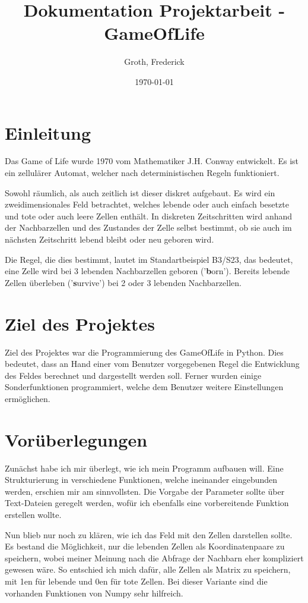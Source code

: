 \documentclass{scrartcl}
\begin{document}
\title{Dokumentation Projektarbeit - GameOfLife}
\author{Groth, Frederick}
\date{\today}
\maketitle
\newpage
\tableofcontents
\newpage
\section{Einleitung}
Das Game of Life wurde 1970 vom Mathematiker J.H. Conway entwickelt. Es ist ein zellulärer Automat, welcher nach deterministischen Regeln funktioniert.

Sowohl räumlich, als auch zeitlich ist dieser diskret aufgebaut. Es wird ein zweidimensionales Feld betrachtet, welches lebende oder auch einfach besetzte und tote oder auch leere Zellen enthält. In diskreten Zeitschritten wird anhand der Nachbarzellen und des Zustandes der Zelle selbst bestimmt, ob sie auch im nächsten Zeitschritt lebend bleibt oder neu geboren wird.

Die Regel, die dies bestimmt, lautet im Standartbeispiel B3/S23, das bedeutet, eine Zelle wird bei 3 lebenden Nachbarzellen geboren ('\textbf{b}orn'). Bereits lebende Zellen überleben ('\textbf{s}urvive') bei 2 oder 3 lebenden Nachbarzellen.
\section{Ziel des Projektes}
Ziel des Projektes war die Programmierung des GameOfLife in Python.
Dies bedeutet, dass an Hand einer vom Benutzer vorgegebenen Regel die Entwicklung des Feldes berechnet und dargestellt werden soll. Ferner wurden einige Sonderfunktionen programmiert, welche dem Benutzer weitere Einstellungen ermöglichen.
\section{Vorüberlegungen}
Zunächst habe ich mir überlegt, wie ich mein Programm aufbauen will. Eine Strukturierung in verschiedene Funktionen, welche ineinander eingebunden werden, erschien mir am sinnvollsten. Die Vorgabe der Parameter sollte über Text-Dateien geregelt werden, wofür ich ebenfalls eine vorbereitende Funktion erstellen wollte.

Nun blieb nur noch zu klären, wie ich das Feld mit den Zellen darstellen sollte. Es bestand die Möglichkeit, nur die lebenden Zellen als Koordinatenpaare zu speichern, wobei meiner Meinung nach die Abfrage der Nachbarn eher kompliziert gewesen wäre. So entschied ich mich dafür, alle Zellen als Matrix zu speichern, mit 1en für lebende und 0en für tote Zellen. Bei dieser Variante sind die vorhanden Funktionen von Numpy sehr hilfreich.
\end{document}
